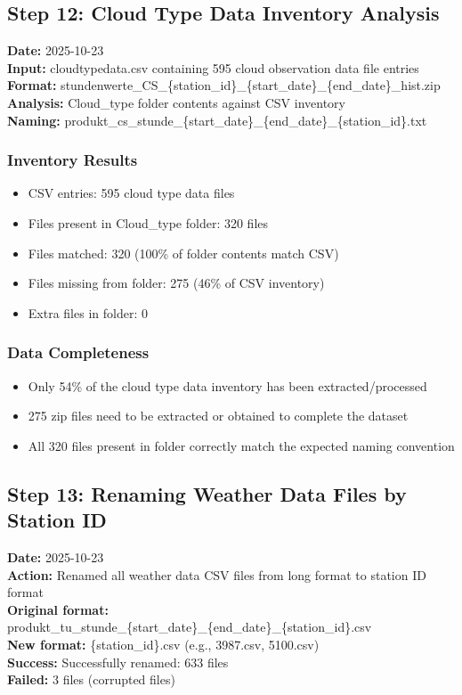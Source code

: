\documentclass[11pt,a4paper]{article}
\begin{document}
\subsection{Step 12: Cloud Type Data Inventory Analysis}
\textbf{Date:} 2025-10-23\\
\textbf{Input:} cloudtypedata.csv containing 595 cloud observation data file entries\\
\textbf{Format:} stundenwerte\_CS\_\{station\_id\}\_\{start\_date\}\_\{end\_date\}\_hist.zip\\
\textbf{Analysis:} Cloud\_type folder contents against CSV inventory\\
\textbf{Naming:} produkt\_cs\_stunde\_\{start\_date\}\_\{end\_date\}\_\{station\_id\}.txt

\subsubsection{Inventory Results}
\begin{itemize}
    \item CSV entries: 595 cloud type data files
    \item Files present in Cloud\_type folder: 320 files
    \item Files matched: 320 (100\% of folder contents match CSV)
    \item Files missing from folder: 275 (46\% of CSV inventory)
    \item Extra files in folder: 0
\end{itemize}

\subsubsection{Data Completeness}
\begin{itemize}
    \item Only 54\% of the cloud type data inventory has been extracted/processed
    \item 275 zip files need to be extracted or obtained to complete the dataset
    \item All 320 files present in folder correctly match the expected naming convention
\end{itemize}

\subsection{Step 13: Renaming Weather Data Files by Station ID}
\textbf{Date:} 2025-10-23\\
\textbf{Action:} Renamed all weather data CSV files from long format to station ID format\\
\textbf{Original format:} produkt\_tu\_stunde\_\{start\_date\}\_\{end\_date\}\_\{station\_id\}.csv\\
\textbf{New format:} \{station\_id\}.csv (e.g., 3987.csv, 5100.csv)\\
\textbf{Success:} Successfully renamed: 633 files\\
\textbf{Failed:} 3 files (corrupted files)
\end{document}

